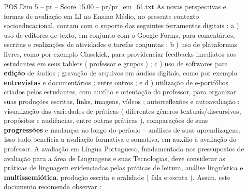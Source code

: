 \begin{textsample}{POS Dim 5 – pr – Score 15.00 – pr/pr\_em\_61.txt}
As novas perspectivas e formas de avaliação em LI no Ensino Médio, no presente contexto socioeducacional, contam com o suporte das seguintes ferramentas digitais : a ) uso de editores de texto, em conjunto com o Google Forms, para comentários, escritas e realizações de atividades e tarefas conjuntas ; b ) uso de plataformas livres, como por exemplo Classkick, para providenciar feedbacks imediatos aos estudantes em seus tablets ( professor e grupos ) ; c ) uso de softwares para \textbf{edição} de áudios ; gravação de arquivos em áudios digitais, como por exemplo \textbf{entrevistas} e documentários ; entre outros ; e d ) utilização de e-portfólios criados pelos estudantes, com auxílio e orientação do professor, para organizar suas produções escritas, links, imagens, vídeos ; autorreflexões e autoavaliação ; visualização das variedades de práticas ( diferentes gêneros textuais/discursivos, propósitos e audiências, entre outras práticas ), comparações de suas \textbf{progressões} e mudanças ao longo do período – análises de suas aprendizagens.
Isso tudo beneficia a avaliação formativa e somativa, em auxílio à avaliação do professor.
A avaliação em Língua Portuguesa, fundamentada nos pressupostos de avaliação para a área de Linguagens e suas Tecnologias, deve considerar as práticas de linguagem evidenciadas pelas práticas de leitura, análise linguística e \textbf{multissemiótica}, produção escrita e oralidade ( fala e escuta ).
Assim, este documento recomenda observar :

\end{textsample}
